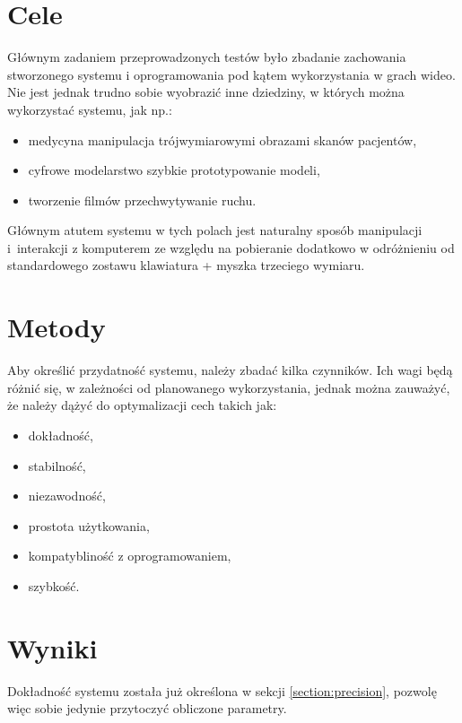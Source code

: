 \label{ch:tests}

\section{Cele}

Głównym zadaniem przeprowadzonych testów było zbadanie zachowania stworzonego systemu i oprogramowania pod kątem wykorzystania w grach wideo. Nie jest jednak trudno sobie wyobrazić inne dziedziny, w których można wykorzystać systemu, jak np.:
\begin{itemize}
 \item medycyna \ppauza manipulacja trójwymiarowymi obrazami skanów pacjentów,
 \item cyfrowe modelarstwo \ppauza szybkie prototypowanie modeli,
 \item tworzenie filmów \ppauza przechwytywanie ruchu.
\end{itemize}

Głównym atutem systemu w tych polach jest naturalny sposób manipulacji i~interakcji z komputerem ze względu na pobieranie dodatkowo \ppauza w odróżnieniu od standardowego zostawu klawiatura + myszka \ppauza trzeciego wymiaru.

\section{Metody}
Aby określić przydatność systemu, należy zbadać kilka czynników. Ich wagi będą różnić się, w zależności od planowanego wykorzystania, jednak można zauważyć, że należy dążyć do optymalizacji cech takich jak:
\begin{itemize}
 \item dokładność,
 \item stabilność,
 \item niezawodność,
 \item prostota użytkowania,
 \item kompatybliność z oprogramowaniem,
 \item szybkość.
\end{itemize}


\section{Wyniki}
Dokładność systemu została już określona w sekcji \ref{section:precision}, pozwolę więc sobie jedynie przytoczyć obliczone parametry.

